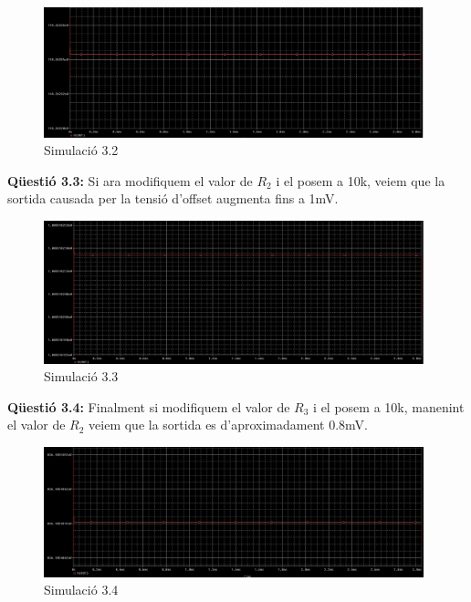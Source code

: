 \documentclass[12pt, a4papre]{article}
\begin{document}
	\begin{figure}[H]
		\begin{center}
		\includegraphics[width=110mm]{Captura_3.2.PNG}
		\caption{Simulació 3.2}
		\end{center}
	\end{figure}
	
	\textbf{Qüestió 3.3:} Si ara modifiquem el valor de $R_2$ i el posem a 10k, veiem que la sortida causada per la tensió d'offset augmenta fins a 1mV.
	
	\begin{figure}[H]
		\begin{center}
		\includegraphics[width=110mm]{Captura_3.3.PNG}
		\caption{Simulació 3.3}
		\end{center}
	\end{figure}
	
	\textbf{Qüestió 3.4:} Finalment si modifiquem el valor de $R_3$ i el posem a 10k, manenint el valor de $R_2$ veiem que la sortida es d'aproximadament 0.8mV.
	
	\begin{figure}[H]
		\begin{center}
		\includegraphics[width=110mm]{Captura_3.4.PNG}
		\caption{Simulació 3.4}
		\end{center}
	\end{figure}
	
\end{document}
